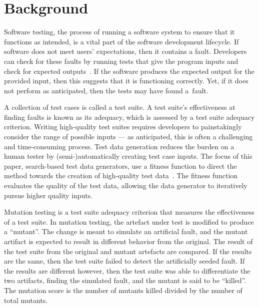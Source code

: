 \section{Background}\label{sec:background}


Software testing, the process of running a software system to ensure that it functions as intended, is a vital part of
the software development lifecycle. If software does not meet users' expectations, then it contains a fault.  Developers
can check for these faults by running tests that give the program inputs and check for expected
outputs~\cite{ammann2008}.  If the software produces the expected output for the provided input, then this suggests that
it is functioning correctly.  Yet, if it does not perform as anticipated, then the tests may have found \mbox{a fault}.


A collection of test cases is called a test suite. A test suite's effectiveness at finding faults is known as its
adequacy, which is assessed by a test suite adequacy criterion.  Writing high-quality test suites requires developers to
painstakingly consider the range of possible inputs --- as anticipated, this is often a challenging and time-consuming
process. Test data generation reduces the burden on a human tester by (semi-)automatically creating test case inputs.
The focus of this paper, search-based test data generators, use a fitness function to direct the method towards the
creation of high-quality test data~\cite{STVR:STVR294}. The fitness function evaluates the quality of the test data,
allowing the data generator to iteratively pursue higher quality inputs.


Mutation testing is a test suite adequacy criterion that measures the effectiveness of a test suite. In mutation
testing, the artefact under test is modified to produce a ``mutant''. The change is meant to simulate an artificial
fault, and the mutant artifact is expected to result in different behavior from the original. The result of the test
suite from the original and mutant artefacts are compared. If the results are the same, then the test suite failed to
detect the artificially seeded fault. If the results are different however, then the test suite was able to
differentiate the two artifacts, finding the simulated fault, and the mutant is said to be ``killed''.  The mutation
score is the number of mutants killed divided by the number of total mutants.


